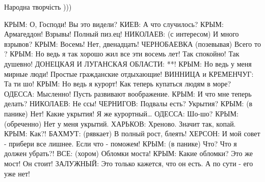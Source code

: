  
 
 
 
 

Народна творчість )))

\obeycr
КРЫМ: О, Господи! Вы это видели?
КИЕВ: А что случилось?
КРЫМ: Армагеддон! Взрывы! Полный пиз.ец!
НИКОЛАЕВ: (с интересом) И много взрывов?
КРЫМ: Восемь! Нет, двенадцать!
ЧЕРНОБАЕВКА (позевывая) Всего то ?
КРЫМ: Но ведь я так хорошо жил все эти восемь лет! Так спокойно! Так душевно!
ДОНЕЦКАЯ И ЛУГАНСКАЯ ОБЛАСТИ: **!
КРЫМ: Но ведь у меня мирные люди! Простые гражданские отдыхающие!
ВИННИЦА и КРЕМЕНЧУГ: Та ти шо!
КРЫМ: Но ведь я курорт! Как теперь купаться людям в море?
ОДЕССА: Мысленно! Пусть развивают воображение.
КРЫМ: И что мне теперь делать?
НИКОЛАЕВ: Не ссы!
ЧЕРНИГОВ: Подвалы есть? Укрытия?
КРЫМ: (в панике) Нет! Какие укрытия! Я же курортный…
ОДЕССА: Шо-шо?
КРЫМ: (обреченно) Нет у меня укрытий.
ХАРЬКОВ: Хреново. Значит так, копай.
КРЫМ: Как?!
БАХМУТ: (рявкает) В полный рост, блеять!
ХЕРСОН: И мой совет - прибери все лишнее. Если что - поможем!
КРЫМ: (в панике) Что? Что я должен убрать?!
ВСЕ: (хором) Обломки моста!
КРЫМ: Какие обломки? Это же мост! Он стоит!
ЗАЛУЖНЫЙ: Это только кажется, что он есть. А по сути - его уже нет!
\restorecr
